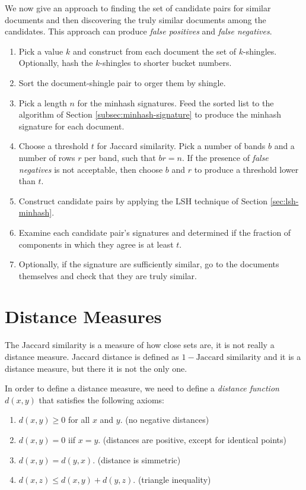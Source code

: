 We now give an approach to finding the set of candidate pairs for similar documents and then discovering the truly similar documents among the candidates. This approach can produce \textit{false positives} and \textit{false negatives}. 

\begin{enumerate}
    \item Pick a value $k$ and construct from each document the set of $k$-shingles. Optionally, hash the $k$-shingles to shorter bucket numbers.
    \item Sort the document-shingle pair to orger them by shingle.
    \item Pick a length $n$ for the minhash signatures. Feed the sorted list to the algorithm of Section \ref{subsec:minhash-signature} to produce the minhash signature for each document.
    \item Choose a threshold $t$ for Jaccard similarity. Pick a number of bands $b$ and a number of rows $r$ per band, such that $br = n$. If the presence of \textit{false negatives} is not acceptable, then choose $b$ and $r$ to produce a threshold lower than $t$.
    \item Construct candidate pairs by applying the LSH technique of Section \ref{sec:lsh-minhash}.
    \item Examine each candidate pair's signatures and determined if the fraction of components in which they agree is at least $t$.
    \item Optionally, if the signature are sufficiently similar, go to the documents themselves and check that they are truly similar.
\end{enumerate}

\section{Distance Measures}\label{sec:distance-measures}

The Jaccard similarity is a measure of how close sets are, it is not really a distance measure. Jaccard distance is defined as $1 - \text{Jaccard similarity}$ and it is a distance measure, but there it is not the only one.

In order to define a distance measure, we need to define a \textit{distance function} $d(x, y)$ that satisfies the following axioms:

\begin{enumerate}
    \item $d(x, y) \geq 0$ for all $x$ and $y$. (no negative distances)
    \item $d(x, y) = 0$ iif $x = y$. (distances are positive, except for identical points)
    \item $d(x, y) = d(y, x)$. (distance is simmetric)
    \item $d(x, z) \leq d(x, y) + d(y, z)$. (triangle inequality)
\end{enumerate}

